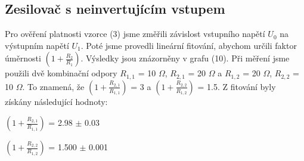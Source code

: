 \documentclass[a4paper,11pt]{article}
\begin{document}
    \begin{minipage}[t]{0.5\textwidth}
            \subsection{Zesilovač s neinvertujícím vstupem}
                Pro ověření platnosti vzorce (3) jsme změřili závislost vstupního napětí $U_0$ na výstupním napětí $U_1$. Poté jsme provedli lineární fitování, abychom určili faktor úměrnosti $\left(1 + \frac{R_2}{R_1}\right)$. Výsledky jsou znázorněny v grafu (10).
                Při měření jsme použili dvě kombinační odpory $R_{1,1}$ = 10 $\Omega$, $R_{2,1}$ = 20 $\Omega$ a $R_{1,2}$ = 20 $\Omega$, $R_{2,2}$ = 10 $\Omega$. To znamená, že $\left(1 + \frac{R_{2,1}}{R_{1,1}}\right)$ = 3 a $\left(1 + \frac{R_{2,2}}{R_{1,2}}\right)$ = 1.5. Z fitování byly získány následující hodnoty:
                \begin{center}
                    $\left(1 + \frac{R_{2,1}}{R_{1,1}}\right)$ = 2.98 $\pm$ 0.03
                    \vspace{10pt}
                    \par $\left(1 + \frac{R_{2,2}}{R_{1,2}}\right)$ = 1.500 $\pm$ 0.001
                \end{center}


\end{minipage}
\end{document}
